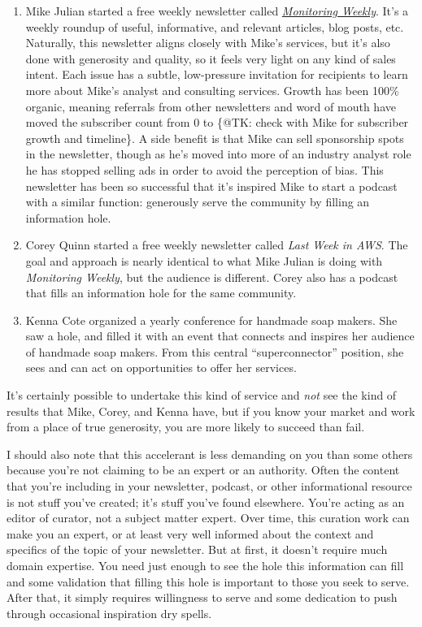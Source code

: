 \begin{enumerate}
\item Mike Julian started a free weekly newsletter called \href{http://monitoring.love}{\emph{Monitoring Weekly}}. It’s a weekly roundup of useful, informative, and relevant articles, blog posts, etc. Naturally, this newsletter aligns closely with Mike’s services, but it’s also done with generosity and quality, so it feels very light on any kind of sales intent. Each issue has a subtle, low-pressure invitation for recipients to learn more about Mike’s analyst and consulting services. Growth has been 100\% organic, meaning referrals from other newsletters and word of mouth have moved the subscriber count from 0 to \{@TK: check with Mike for subscriber growth and timeline\}. A side benefit is that Mike can sell sponsorship spots in the newsletter, though as he’s moved into more of an industry analyst role he has stopped selling ads in order to avoid the perception of bias. This newsletter has been so successful that it’s inspired Mike to start a podcast with a similar function: generously serve the community by filling an information hole.
\item Corey Quinn started a free weekly newsletter called \emph{Last Week in AWS}. The goal and approach is nearly identical to what Mike Julian is doing with \emph{Monitoring Weekly}, but the audience is different. Corey also has a podcast that fills an information hole for the same community.
\item Kenna Cote organized a yearly conference for handmade soap makers. She saw a hole, and filled it with an event that connects and inspires her audience of handmade soap makers. From this central “superconnector” position, she sees and can act on opportunities to offer her services.
\end{enumerate}

It’s certainly possible to undertake this kind of service and \emph{not} see the kind of results that Mike, Corey, and Kenna have, but if you know your market and work from a place of true generosity, you are more likely to succeed than fail.

I should also note that this accelerant is less demanding on you than some others because you’re not claiming to be an expert or an authority. Often the content that you’re including in your newsletter, podcast, or other informational resource is not stuff you’ve created; it’s stuff you’ve found elsewhere. You’re acting as an editor of curator, not a subject matter expert. Over time, this curation work can make you an expert, or at least very well informed about the context and specifics of the topic of your newsletter. But at first, it doesn’t require much domain expertise. You need just enough to see the hole this information can fill and some validation that filling this hole is important to those you seek to serve. After that, it simply requires willingness to serve and some dedication to push through occasional inspiration dry spells.

